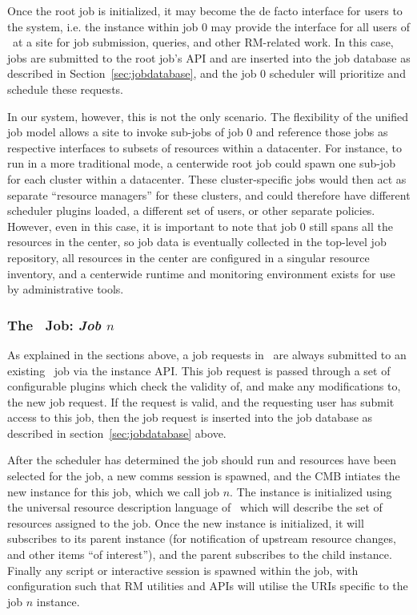 Once the root job is initialized, it may become the de facto interface
for users to the system, i.e. the instance within job 0 may
provide the interface for all users of \ngrm\ at a site for
job submission, queries, and other RM-related work. In this
case, jobs are submitted to the root job's API and are
inserted into the job database as described in Section~\ref{sec:jobdatabase},
and the job 0 scheduler will prioritize and schedule these
requests.

In our system, however, this is not the only scenario. The
flexibility of the unified job model allows a site to invoke
sub-jobs of job 0 and reference those jobs as respective interfaces
to subsets of resources within a datacenter.  For instance, to run
in a more traditional mode, a centerwide root job could spawn one
sub-job for each cluster within a datacenter. These cluster-specific
jobs would then act as separate ``resource managers'' for these
clusters, and could therefore have different scheduler plugins
loaded, a different set of users, or other separate policies.
However, even in this case, it is important to note that job 0 still
spans all the resources in the center, so job data is eventually
collected in the top-level job repository, all resources in the
center are configured in a singular resource inventory, and a
centerwide runtime and monitoring environment exists for use by
administrative tools.

\subsubsection{The \ngrm\ Job: \emph{Job $n$}}

As explained in the sections above, a job requests in \ngrm\ are
always submitted to an existing \ngrm\ job via the instance API.
This job request is passed through a set of configurable plugins
which check the validity of, and make any modifications to, the
new job request. If the request is valid, and the requesting user
has submit access to this job, then the job request is inserted
into the job database as described in section~\ref{sec:jobdatabase}
above.

After the scheduler has determined the job should run and
resources have been selected for the job, a new comms session
is spawned, and the CMB intiates the new instance for this
job, which we call job $n$. The instance is initialized using
the universal resource description language  of \ngrm\, which
will describe the set of resources assigned to the job. Once the
new instance is initialized, it will subscribes to its parent
instance (for notification of upstream resource changes, and
other items ``of interest''), and the parent subscribes to the
child instance. Finally any script or interactive session is spawned
within the job, with configuration such that RM utilities and
APIs will utilise the URIs specific to the job $n$ instance.
\ifcomments
{}
\fi

